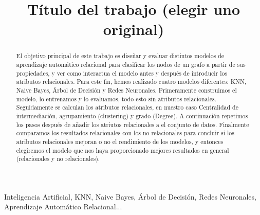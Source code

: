 \documentclass[conference,a4paper]{IEEEtran}
\begin{document}
\title{Título del trabajo (elegir uno original)}

\author{
  
  \and
  
}

\maketitle


\begin{abstract}

  El objetivo principal de este trabajo es diseñar y evaluar distintos modelos de aprendizaje automático       relacional para clasificar los nodos de un grafo a partir de sus propiedades, y ver como interactua el modelo  antes y después de introducir los atributos relacionales. 
  Para este fin, hemos realizado cuatro modelos diferentes: KNN, Naive Bayes, Árbol de Decisión y Redes Neuronales. Primeramente construimos el modelo, lo entrenamos y lo evaluamos, todo esto sin atributos relacionales. Seguidamente se calculan los atributos relacionales, en nuestro caso Centralidad de intermediación, agrupamiento (clustering) y grado (Degree). A continuación repetimos los pasos después de añadir los atriutos relacionales a el conjunto de datos. Finalmente comparamos los resultados relacionales con los no relacionales para concluir si los atributos relacionales mejoran o no el rendimiento de los modelos, y entonces elegiremos el modelo que nos haya proporcionado mejores resultados  en general (relacionales y no relacionales).

\end{abstract}


\begin{IEEEkeywords}
  Inteligencia Artificial, KNN, Naive Bayes, Árbol de Decisión, Redes Neuronales, Aprendizaje Automático Relacional...
\end{IEEEkeywords}
\end{document}
